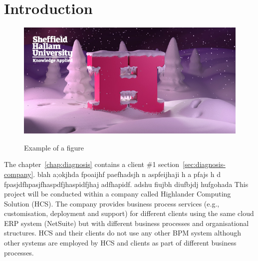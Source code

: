 \chapter{Introduction}

\begin{figure}[!htb]
    \caption{Example of a figure}
    \centering 
    \includegraphics[scale=0.5]{img.png}
    \label{figure:img}
\end{figure}



The chapter~\ref{chap:diagnosis} contains a client \#1 section~\ref{sec:diagnosis-company}.
blah a;okjhda fpoaijhf paefhadsjh n aspfeijhaji h a pfajs h d fpasjdfhpasjfhaspdfjhaspidfjhaj adfhapidf. adshu fiujbh diufbjdj hufgohada This project will be conducted within a company called Highlander Computing Solution (HCS). The company provides business process services (e.g., customisation, deployment and support) for different clients using the same cloud ERP system (NetSuite) but with different business processes and organisational structures. HCS and their clients do not use any other BPM system although other systems are employed by HCS and clients as part of different business processes.




